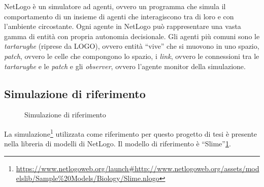 NetLogo è un simulatore ad agenti, ovvero un
programma che simula il comportamento di un insieme di agenti che interagiscono tra di loro e con
l'ambiente circostante. Ogni agente in NetLogo può rappresentare una vasta gamma di entità con propria autonomia
decisionale. Gli agenti più comuni sono le \textit{tartarughe} (riprese da LOGO), ovvero entità ``vive'' che si muovono in uno spazio,
\textit{patch}, ovvero le celle che compongono lo spazio, i \textit{link}, ovvero le connessioni tra le \textit{tartarughe} e 
le \textit{patch} e gli \textit{observer}, ovvero l'agente monitor della simulazione.

\subsection{Simulazione di riferimento}\label{refSim}
\begin{figure}[ht]
    \centering
    \caption{Simulazione di riferimento}\label{fig:refsimfoto}
\end{figure}
La simulazione\footnote{\url{https://www.netlogoweb.org/launch\#http://www.netlogoweb.org/assets/modelslib/Sample\%20Models/Biology/Slime.nlogo}}
utilizzata come riferimento per questo progetto di tesi è presente nella libreria
di modelli di NetLogo. Il modello di riferimento è ``Slime''\space\cite{wilensky1997netlogo}\space\cref{fig:refsimfoto}.
